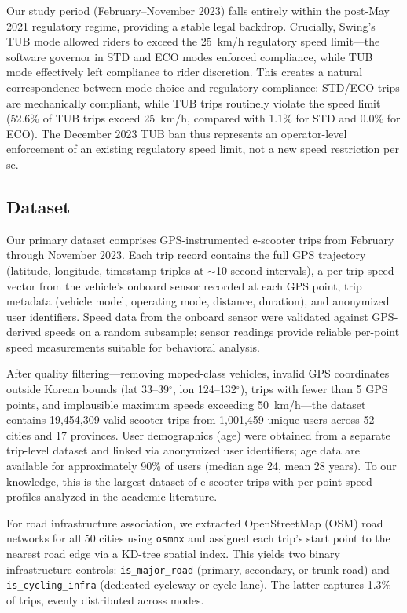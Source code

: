 Our study period (February--November 2023) falls entirely within the post-May 2021 regulatory regime, providing a stable legal backdrop. Crucially, Swing's TUB mode allowed riders to exceed the 25~km/h regulatory speed limit---the software governor in STD and ECO modes enforced compliance, while TUB mode effectively left compliance to rider discretion. This creates a natural correspondence between mode choice and regulatory compliance: STD/ECO trips are mechanically compliant, while TUB trips routinely violate the speed limit (52.6\% of TUB trips exceed 25~km/h, compared with 1.1\% for STD and 0.0\% for ECO). The December 2023 TUB ban thus represents an operator-level enforcement of an existing regulatory speed limit, not a new speed restriction per se.

\subsection{Dataset}
\label{sec:data_dataset}

Our primary dataset comprises GPS-instrumented e-scooter trips from February through November 2023. Each trip record contains the full GPS trajectory (latitude, longitude, timestamp triples at $\sim$10-second intervals), a per-trip speed vector from the vehicle's onboard sensor recorded at each GPS point, trip metadata (vehicle model, operating mode, distance, duration), and anonymized user identifiers. Speed data from the onboard sensor were validated against GPS-derived speeds on a random subsample; sensor readings provide reliable per-point speed measurements suitable for behavioral analysis.

After quality filtering---removing moped-class vehicles, invalid GPS coordinates outside Korean bounds (lat 33--39$^\circ$, lon 124--132$^\circ$), trips with fewer than 5 GPS points, and implausible maximum speeds exceeding 50~km/h---the dataset contains 19,454,309 valid scooter trips from 1,001,459 unique users across 52 cities and 17 provinces. User demographics (age) were obtained from a separate trip-level dataset and linked via anonymized user identifiers; age data are available for approximately 90\% of users (median age 24, mean 28 years). To our knowledge, this is the largest dataset of e-scooter trips with per-point speed profiles analyzed in the academic literature.

For road infrastructure association, we extracted OpenStreetMap (OSM) road networks for all 50 cities using \texttt{osmnx} \citep{boeing2017osmnx} and assigned each trip's start point to the nearest road edge via a KD-tree spatial index. This yields two binary infrastructure controls: \texttt{is\_major\_road} (primary, secondary, or trunk road) and \texttt{is\_cycling\_infra} (dedicated cycleway or cycle lane). The latter captures 1.3\% of trips, evenly distributed across modes.

